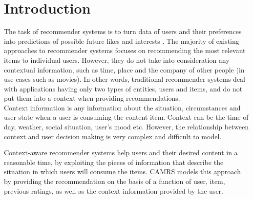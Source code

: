 \documentclass{article}
\begin{document}
 


\section{Introduction}
The task of recommender systems is to turn data of users and their preferences into predictions of possible future likes and interests \cite{adomavicius2011context}.  The majority of existing approaches to recommender systems focuses on recommending the most relevant items to individual users. However, they do not take into consideration any contextual information, such as time, place and the company of other people (in use cases such as movies). In other words, traditional recommender systems deal with applications having only two types of entities, users and items, and do not put them into a context when providing recommendations. \\

Context information is any information about the situation, circumstances and user state when a user is consuming the content item. Context can be the time of day, weather, social situation, user’s mood etc. However, the relationship between context and user decision making is very complex and difficult to model. 

Context-aware recommender systems help users and their desired content in a reasonable time, by exploiting the pieces of information that describe the situation in which users will consume the items. CAMRS models this approach by providing the recommendation on the basis of a function of user, item, previous ratings, as well as the context information provided by the user.
\end{document}
